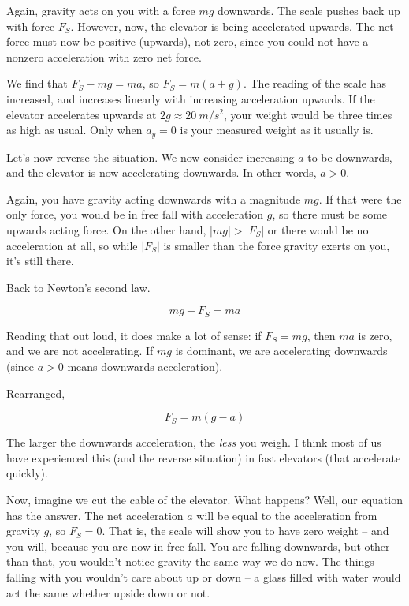 Again, gravity acts on you with a force $m g$ downwards. The scale pushes back up with force $F_S$. However, now, the elevator is being accelerated upwards. The net force must now be positive (upwards), not zero, since you could not have a nonzero acceleration with zero net force.

We find that $F_S - m g = m a$, so $F_S = m(a + g)$. The reading of the scale has increased, and increases linearly with increasing acceleration upwards. If the elevator accelerates upwards at $2g \approx \SI{20}{m/s^2}$, your weight would be three times as high as usual. Only when $a_y = 0$ is your measured weight as it usually is.

Let's now reverse the situation. We now consider increasing $a$ to be downwards, and the elevator is now accelerating downwards. In other words, $a > 0$.

Again, you have gravity acting downwards with a magnitude $m g$. If that were the only force, you would be in free fall with acceleration $g$, so there must be some upwards acting force. On the other hand, $|m g| > |F_S|$ or there would be no acceleration at all, so while $|F_S|$ is smaller than the force gravity exerts on you, it's still there.

Back to Newton's second law.

\begin{equation}
m g - F_S = m a
\end{equation}

Reading that out loud, it does make a lot of sense: if $F_S = m g$, then $m a$ is zero, and we are not accelerating. If $m g$ is dominant, we are accelerating downwards (since $a > 0$ means downwards acceleration).

Rearranged,

\begin{equation}
F_S = m(g - a)
\end{equation}

The larger the downwards acceleration, the \emph{less} you weigh. I think most of us have experienced this (and the reverse situation) in fast elevators (that accelerate quickly).

Now, imagine we cut the cable of the elevator. What happens? Well, our equation has the answer. The net acceleration $a$ will be equal to the acceleration from gravity $g$, so $F_S = 0$. That is, the scale will show you to have zero weight -- and you will, because you are now in free fall. You are falling downwards, but other than that, you wouldn't notice gravity the same way we do now. The things falling with you wouldn't care about up or down -- a glass filled with water would act the same whether upside down or not.

